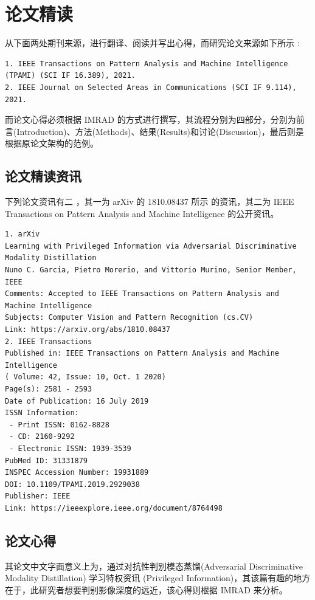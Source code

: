 \chapter{论文精读}
\label{chap:1}

从下面两处期刊来源，进行翻译、阅读并写出心得，而研究论文来源如下所示 :
\begin{Verbatim}
1. IEEE Transactions on Pattern Analysis and Machine Intelligence
(TPAMI) (SCI IF 16.389), 2021.
2. IEEE Journal on Selected Areas in Communications (SCI IF 9.114), 2021.
\end{Verbatim}

而论文心得必须根据 IMRAD 的方式进行撰写，其流程分别为四部分，分别为前言(Introduction)、方法(Methods)、结果(Results)和讨论(Discussion)，最后则是根据原论文架构的范例。

\section{论文精读资讯}

下列论文资讯有二 \cite{garcia2020admd} ，其一为 arXiv 的 1810.08437 所示 的资讯，其二为 IEEE Transactions on Pattern Analysis and Machine Intelligence 的公开资讯。

\begin{Verbatim}
1. arXiv
Learning with Privileged Information via Adversarial Discriminative Modality Distillation
Nuno C. Garcia, Pietro Morerio, and Vittorio Murino, Senior Member, IEEE
Comments: Accepted to IEEE Transactions on Pattern Analysis and Machine Intelligence
Subjects: Computer Vision and Pattern Recognition (cs.CV)
Link: https://arxiv.org/abs/1810.08437
2. IEEE Transactions
Published in: IEEE Transactions on Pattern Analysis and Machine Intelligence 
( Volume: 42, Issue: 10, Oct. 1 2020)
Page(s): 2581 - 2593
Date of Publication: 16 July 2019 
ISSN Information:
 - Print ISSN: 0162-8828
 - CD: 2160-9292
 - Electronic ISSN: 1939-3539
PubMed ID: 31331879
INSPEC Accession Number: 19931889
DOI: 10.1109/TPAMI.2019.2929038
Publisher: IEEE
Link: https://ieeexplore.ieee.org/document/8764498
\end{Verbatim}


\section{论文心得}

其论文中文字面意义上为，通过对抗性判别模态蒸馏(Adversarial Discriminative Modality Distillation) 学习特权资讯 (Privileged Information)，其该篇有趣的地方在于，此研究者想要判别影像深度的远近，该心得则根据 IMRAD 来分析。

